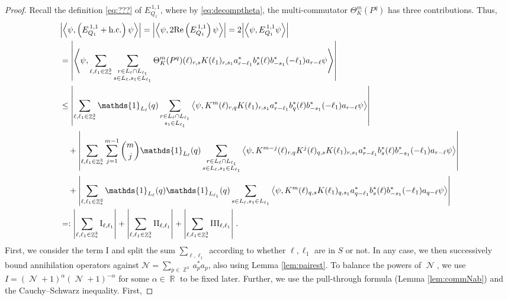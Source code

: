 \documentclass[sn-mathphys, Numbered ,a4paper]{sn-jnl}%
\DeclareMathOperator{\R}{\mathbb{R}}
\DeclareMathOperator{\Z}{\mathbb{Z}}
\DeclareMathOperator{\NN}{\mathcal{N}}
\newcommand{\eva}[1]{\left\langle #1 \right\rangle}
\newcommand{\I}{\mathrm{I}}
\newcommand{\II}{\mathrm{II}}
\newcommand{\III}{\mathrm{III}}
\theoremstyle{plain}
\theoremstyle{definition}
\theoremstyle{remark}
\theoremstyle{plain}
\theoremstyle{definition}
\theoremstyle{remark}
\begin{document}
\begin{proof} Recall the definition \eqref{eq:???} of $ E^{\,1,1}_{Q_1} $, where by \eqref{eq:decomptheta}, the multi-commutator $ \Theta^m_K(P^q) $ has three contributions. Thus,
\begin{align}
	&\abs{\eva{\psi,\left(E^{\,1,1}_{Q_1}+\mathrm{h.c.}\right) \psi }} = \abs{\eva{\psi,2\mathrm{Re}\left(E^{\,1,1}_{Q_1}\right) \psi }} = 2\abs{\eva{\psi, E^{\,1,1}_{Q_1} \psi }}\nonumber\\
	&=\abs{\eva{\psi, \sum\limits_{\ell, \ell_1\in \Z^3_*}\sum\limits_{\substack{r\in L_{\ell} \cap L_{\ell_1}\\  s \in L_{\ell}, s_1\in L_{\ell_1}}} \Theta^m_{K}(P^q)(\ell)_{r,s} K(\ell_1)_{r,s_1} a^*_{r-\ell_1} b^*_{s}(\ell) b^*_{-s_1}(-\ell_1) a_{r-\ell} \psi }} \nonumber\\
	&\leq \abs{\sum\limits_{\ell, \ell_1\in \Z^3_*} \mathds{1}_{L_{\ell}}(q) \sum\limits_{\substack{r\in L_{\ell} \cap L_{\ell_1}\\s_1\in L_{\ell_1}}} \eva{\psi, K^m(\ell )_{r,q} K(\ell_1)_{r,s_1} a^*_{r-\ell_1} b^*_{q}(\ell) b^*_{-s_1}(-\ell_1) a_{r-\ell} \psi }}\\
	&\quad + \abs{\sum\limits_{\ell, \ell_1\in \Z^3_*} \sum\limits_{j=1}^{m-1} {{m}\choose j} \mathds{1}_{L_{\ell}}(q) \sum\limits_{\substack{r\in L_{\ell} \cap L_{\ell_1}\\ s \in L_{\ell},s_1\in L_{\ell_1}}}  \eva{\psi,  K^{m-j}(\ell)_{r,q} K^{j}(\ell)_{q,s} K(\ell_1)_{r,s_1} a^*_{r-\ell_1} b^*_{s}(\ell) b^*_{-s_1}(-\ell_1) a_{r-\ell} \psi }} \\
	&\quad + \abs{\sum\limits_{\ell, \ell_1\in \Z^3_*} \mathds{1}_{L_{\ell}}(q) \mathds{1}_{L_{\ell_1}}(q) \sum\limits_{s \in L_{\ell},s_1\in L_{\ell_1}} \eva{\psi, K^m(\ell)_{q,s}K(\ell_1)_{q,s_1}
	a^*_{q-\ell_1}b^*_{s}(\ell) b^*_{-s_1}(-\ell_1)a_{q-\ell} \psi }}\\
	&=: \abs{\sum_{\ell, \ell_1 \in \Z^3_*} \I_{\ell,\ell_1}}
		+ \abs{\sum_{\ell, \ell_1 \in \Z^3_*} \II_{\ell,\ell_1}}
		+ \abs{\sum_{\ell, \ell_1 \in \Z^3_*} \III_{\ell,\ell_1}} \;.
\end{align}
First, we consider the term $ \I $ and split the sum $ \sum_{\ell, \ell_1} $ according to whether $ \ell, \ell_1 $ are in $ S $ or not. In any case, we then successively bound annihilation operators against $ \mathcal{N} = \sum_{p \in \Z^3} a_p^* a_p $, also using Lemma \ref{lem:pairest}. To balance the powers of $ \NN $, we use $I = (\NN+1)^{\alpha}(\NN+1)^{-\alpha}$ for some $\alpha \in \R$ to be fixed later. Further, we use the pull-through formula (Lemma \ref{lem:commNab}) and the Cauchy--Schwarz inequality. First,

\end{proof}
\end{document}
